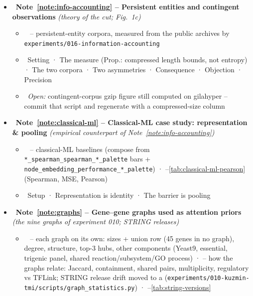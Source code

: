 \begin{itemize}
\begin{itemize}
    \end{itemize}
  \item {}\ \textbf{Note~\ref{note:info-accounting} -- Persistent entities and contingent observations} \emph{(theory of the cut; Fig.~1c)}
    \begin{itemize}\setlength{\itemsep}{0pt}
      \item {}\  -- persistent-entity corpora, measured from the public archives by \texttt{experiments/016-information-accounting}
      \item {}\ Setting · The measure (Prop.: compressed length bounds, not entropy) · The two corpora · Two asymmetries · Consequence · Objection · Precision
      \item {}\ \emph{Open:} contingent-corpus gzip figure still computed on gilahyper -- commit that script and regenerate  with a compressed-size column
    \end{itemize}
  \item {}\ \textbf{Note~\ref{note:classical-ml} -- Classical-ML case study: representation \& pooling} \emph{(empirical counterpart of Note~\ref{note:info-accounting})}
    \begin{itemize}\setlength{\itemsep}{0pt}
      \item {}\  -- classical-ML baselines (compose from \texttt{*\_spearman\_spearman\_*\_palette} bars + \texttt{node\_embedding\_performance\_*\_palette}) · --\ref{tab:classical-ml-pearson} (Spearman, MSE, Pearson)
      \item {}\ Setup · Representation is identity · The barrier is pooling
    \end{itemize}
  \item {}\ \textbf{Note~\ref{note:graphs} -- Gene--gene graphs used as attention priors} \emph{(the nine graphs of experiment 010; STRING releases)}
    \begin{itemize}\setlength{\itemsep}{0pt}
      \item {}\  -- each graph on its own: sizes + union row (45 genes in no graph), degree, structure, top-3 hubs, other components (Yeast9, essential, trigenic panel, shared reaction/subsystem/GO process) ·  -- how the graphs relate: Jaccard, containment, shared pairs, multiplicity, regulatory vs TFLink; STRING release drift moved to a (\texttt{experiments/010-kuzmin-tmi/scripts/graph\_statistics.py}) · --\ref{tab:string-versions}

\end{itemize}
\end{itemize}
